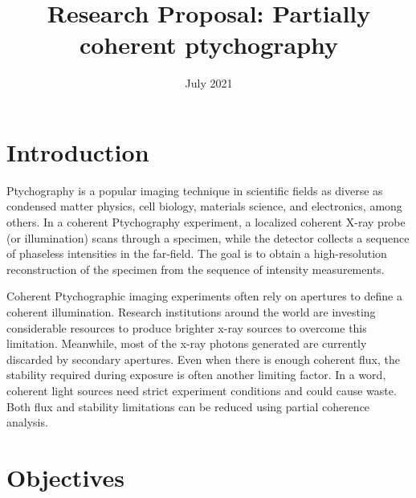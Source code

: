 \documentclass{article}
\title{Research Proposal: Partially coherent ptychography}
\date{July 2021}
\numberwithin{equation}{section}
\begin{document}
\maketitle
\tableofcontents
\section{Introduction}


Ptychography is a popular imaging technique in scientific fields as diverse as condensed matter physics, cell biology, materials science, and electronics, among others. In a coherent Ptychography experiment, a localized coherent X-ray probe (or illumination) scans through a specimen, while the detector collects a sequence of phaseless intensities in the far-field. The goal is to obtain a high-resolution reconstruction of the specimen from the sequence of intensity measurements. 

Coherent Ptychographic imaging experiments often rely on apertures to define a coherent illumination. Research institutions around the world are investing considerable resources to produce brighter x-ray sources to overcome this limitation. Meanwhile, most of the x-ray photons generated are currently discarded by secondary apertures. Even when there is enough coherent flux, the stability required during exposure is often another limiting factor. In a word, coherent light sources need strict experiment conditions and could cause waste. Both flux and stability limitations can be reduced using partial coherence analysis. 



\section{Objectives}
\end{document}
